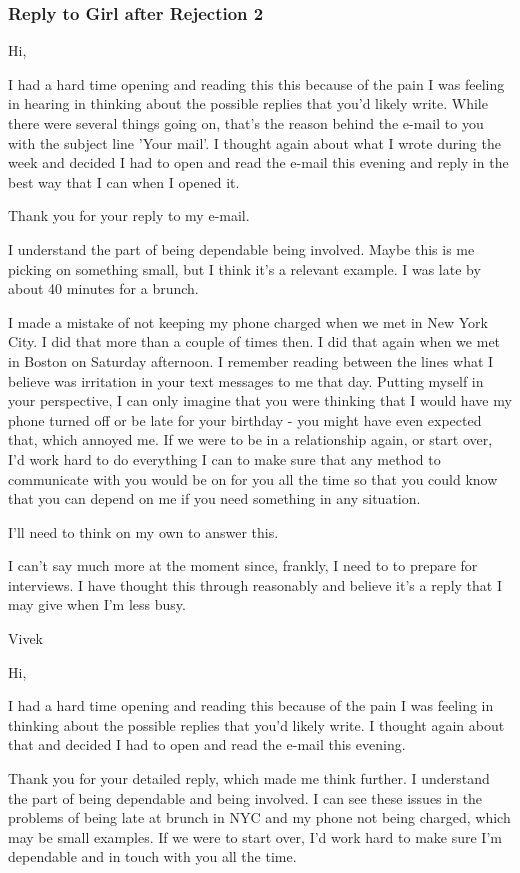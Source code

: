 \begin{frame}
\frametitle{Reply to Girl after Rejection 2} 

Hi, 

I had a hard time opening and reading this this because of the pain
I was feeling in hearing in thinking about the possible replies that
you'd likely write. While there were several things going on, that's the reason behind the
e-mail to you with the subject line 'Your mail'. I thought again about
what I wrote during the week and decided I had to open and read the e-mail this
evening and reply in the best way that I can when I opened it. 

Thank you for your reply to my e-mail.

I understand the part of being dependable being involved. Maybe this
is me picking on something small, but I think it's a relevant
example. I was late by about 40 minutes for a brunch. 


I made a mistake of not keeping my phone charged when we met
in New York City. I did that more than a couple of
times then. I did that again when we met in Boston on Saturday
afternoon. I remember reading between the lines what I believe was
irritation in your text messages to me that day. Putting myself in
your perspective, I can only imagine that you were thinking that I
would have my phone turned off or be late for your birthday - you
might have even expected that, which annoyed me. 
If we were to be in a relationship again, or start over, I'd work hard
to do everything I can to make sure
that any method to communicate with you would be on for you all the
time so that you could know that you can depend on me if you need
something in any situation. 

I'll need to think on my own to answer this. 

I can't say much more at the moment since, frankly, I need to
to prepare for interviews. I have thought this through reasonably and
believe it's a reply that I may give when I'm less busy.

Vivek


Hi,

I had a hard time opening and reading this  because of the pain I was
feeling in thinking about the possible replies that you'd likely
write. I thought again about that and decided I had to open and read
the e-mail this evening.

Thank you for your detailed reply, which made me think further. I
understand the part of being dependable and being involved. I can see
these issues in the problems of being late at brunch in NYC and my
phone not being charged, which may be small examples. If we were to
start over, I'd work hard to make sure I'm dependable and in touch
with you all the time.


\end{frame}
